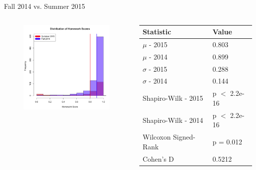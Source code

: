 \documentclass{beamer}
\begin{document}
\begin{frame}{Fall 2014 vs. Summer 2015}
\begin{columns}
\begin{column}{2in}
\begin{figure}
	\includegraphics[width=2in]{img/chapter4/hw_su15_vs_f14}
\end{figure}
\end{column}
\begin{column}{2in}
\begin{scriptsize}
\begin{table}
  \begin{tabular}{|l|l|}
    \hline
    \textbf{Statistic} & \textbf{Value} \\
	\hline
	$\mu$ - 2015 & 0.803 \\
	\hline
	$\mu$ - 2014 & 0.899 \\
	\hline
	$\sigma$ - 2015 & 0.288 \\
	\hline
	$\sigma$ - 2014 & 0.144 \\
	\hline
	Shapiro-Wilk - 2015 & p $<$ 2.2e-16 \\
	\hline
	Shapiro-Wilk - 2014 & p $<$ 2.2e-16 \\
	\hline
	Wilcoxon Signed-Rank & p = 0.012 \\
	\hline
	Cohen's D & 0.5212 \\
	\hline
  \end{tabular}
\end{table}
\end{scriptsize}
\end{column}
\end{columns}
\end{frame}
\end{document}
